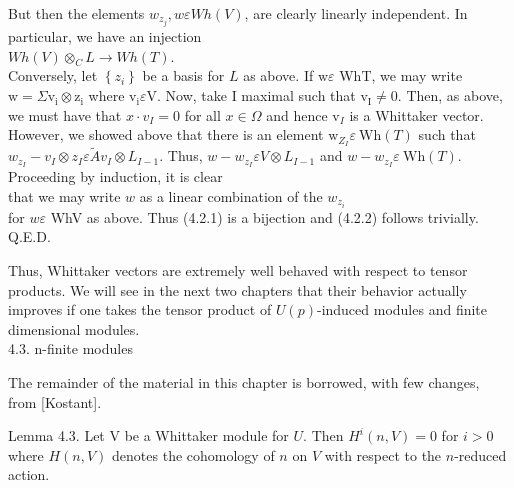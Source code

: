 \documentclass[10pt]{article}
\begin{document}
But then the elements $w_{z_{j}}, w \varepsilon W h(V)$, are clearly linearly independent. In particular, we have an injection\\
$W h(V) \otimes_{C} L \rightarrow W h(T)$.\\
Conversely, let $\left\{z_{i}\right\}$ be a basis for $L$ as above. If $\mathrm{w} \varepsilon$ WhT, we may write $\mathrm{w}=\Sigma \mathrm{v}_{\mathrm{i}} \otimes \mathrm{z}_{\mathrm{i}}$ where $\mathrm{v}_{\mathrm{i}} \varepsilon \mathrm{V}$. Now, take I maximal such that $\mathrm{v}_{\mathrm{I}} \neq 0$. Then, as above, we must have that $x \cdot v_{I}=0$ for all $x \in \Omega$ and hence $\mathrm{v}_{I}$ is a Whittaker vector. However, we showed above that there is an element $\mathrm{w}_{Z_{I}} \varepsilon \mathrm{~Wh}(T)$ such that\\
$w_{z_{I}}-v_{I} \otimes z_{I} \varepsilon \tilde{A} v_{I} \otimes L_{I-1}$. Thus, $w-w_{z_{I}} \varepsilon V \otimes L_{I-1}$ and $w-w_{z_{I}} \varepsilon \mathrm{~Wh}(T)$. Proceeding by induction, it is clear\\
that we may write $w$ as a linear combination of the $w_{z_{i}}$\\
for $w \varepsilon$ WhV as above. Thus (4.2.1) is a bijection and (4.2.2) follows trivially.\\
Q.E.D.

Thus, Whittaker vectors are extremely well behaved with respect to tensor products. We will see in the next two chapters that their behavior actually improves if one takes the tensor product of $U(p)$-induced modules and finite dimensional modules.\\
4.3. n-finite modules

The remainder of the material in this chapter is borrowed, with few changes, from [Kostant].

Lemma 4.3. Let V be a Whittaker module for $U$. Then $H^{i}(n, V)=0$ for $i>0$ where $H(n, V)$ denotes the cohomology of $n$ on $V$ with respect to the $n$-reduced action.
\end{document}

